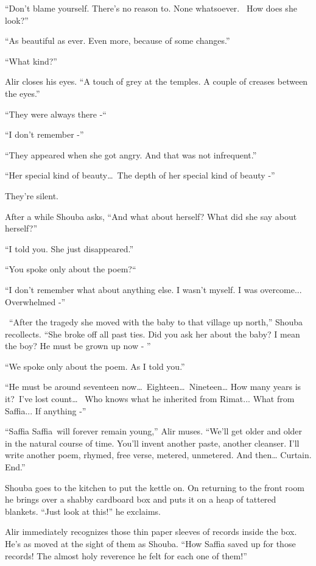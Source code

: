 \documentclass[twoside,11pt]{book}
\begin{document}
``Don't blame yourself. There's no reason to. None whatsoever.~ How does she look?'' 

``As beautiful as ever. Even more, because of some changes.''

``What kind?'' 

Alir closes his eyes. ``A touch of grey at the temples. A couple of creases between the
eyes.'' 

``They were always there -``~ 

``I don't remember -'' 

``They appeared when she got angry. And that was not infrequent.'' 

``Her special kind of beauty{\dots}\ The depth of her special kind of beauty -'' 

They're silent.

After a while Shouba asks, ``And what about herself? What did she say about herself?'' 

``I told you. She just disappeared.'' 

``You spoke only about the poem?``\ 

``I don't remember what about anything else. I wasn't myself. I was overcome... Overwhelmed
-'' 

~``After the tragedy she moved with the baby to that village up north,'' Shouba recollects.
``She broke off all past ties. Did you ask her about the baby? I mean the boy? He must be grown up now -
'' 

``We spoke only about the poem. As I told you.'' 

``He must be around seventeen now{\dots}\ Eighteen{\dots}\ Nineteen{\dots} How many years is it?\ I've lost
count{\dots} ~Who knows what he inherited from Rimat... What from Saffia... If anything -'' 

``Saffia Saffia\ will forever remain young,'' Alir muses. ``We'll get older and
older in the natural course of time. You'll invent another paste, another cleanser. I'll write another poem, rhymed,
free verse, metered, unmetered. And then{\dots} Curtain. End.''

Shouba goes to the kitchen to put the kettle on. On returning to the front room he brings over a shabby cardboard box
and puts it on a heap of tattered blankets. ``Just look at this!'' he exclaims.

Alir immediately recognizes those thin paper sleeves of records inside the box. He's as moved at the sight of them as
Shouba. ``How Saffia saved up for those records! The almost holy reverence he felt for each one of
them!'' 
\end{document}
